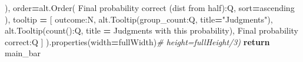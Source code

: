 \documentclass[
]{article}
\newenvironment{Shaded}{\begin{snugshade}}{\end{snugshade}}
\newcommand{\CommentTok}[1]{\textcolor[rgb]{0.56,0.35,0.01}{\textit{#1}}}
\newcommand{\ControlFlowTok}[1]{\textcolor[rgb]{0.13,0.29,0.53}{\textbf{#1}}}
\newcommand{\NormalTok}[1]{#1}
\newcommand{\OperatorTok}[1]{\textcolor[rgb]{0.81,0.36,0.00}{\textbf{#1}}}
\newcommand{\StringTok}[1]{\textcolor[rgb]{0.31,0.60,0.02}{#1}}
\begin{document}
\begin{Shaded}
\begin{Highlighting}[]
\NormalTok{        ),}
\NormalTok{        order}\OperatorTok{=}\NormalTok{alt.Order(}
            \StringTok{\textquotesingle{}Final probability correct (dist from half):Q\textquotesingle{}}\NormalTok{,}
\NormalTok{            sort}\OperatorTok{=}\StringTok{\textquotesingle{}ascending\textquotesingle{}}
\NormalTok{        ),}
\NormalTok{        tooltip }\OperatorTok{=}\NormalTok{ [}
            \StringTok{\textquotesingle{}outcome:N\textquotesingle{}}\NormalTok{,}
\NormalTok{            alt.Tooltip(}\StringTok{\textquotesingle{}group\_count:Q\textquotesingle{}}\NormalTok{, title}\OperatorTok{=}\StringTok{"Judgments"}\NormalTok{),}
\NormalTok{            alt.Tooltip(}\StringTok{\textquotesingle{}count():Q\textquotesingle{}}\NormalTok{, title }\OperatorTok{=} \StringTok{\textquotesingle{}Judgments with this probability\textquotesingle{}}\NormalTok{),}
            \StringTok{\textquotesingle{}Final probability correct:Q\textquotesingle{}}
\NormalTok{        ]}
\NormalTok{    ).properties(width}\OperatorTok{=}\NormalTok{fullWidth)}\CommentTok{\# height=fullHeight/3)}
    \ControlFlowTok{return}\NormalTok{ main\_bar}


\end{Highlighting}
\end{Shaded}
\end{document}
